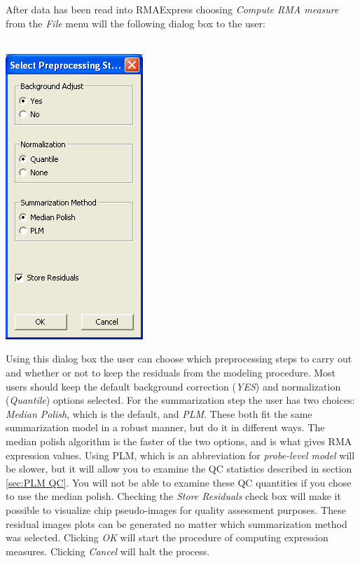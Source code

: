 \documentclass[11pt]{report}
\begin{document}
After data has been read into RMAExpress choosing {\it Compute RMA measure} from the {\it File} menu will the following dialog box to the user: \\ \\
\begin{center}
\includegraphics[scale=0.5]{preprocessingstep}
\end{center}
Using this dialog box the user can choose which preprocessing steps to carry out and whether or not to keep the residuals from the modeling procedure. Most users should keep the default background correction ({\it YES}) and normalization ({\it Quantile}) options selected. For the summarization step the user has two choices: {\it Median Polish}, which is the default, and {\it PLM}. These both fit the same summarization model in a robust manner, but do it in different ways. The median polish algorithm is the faster of the two options, and is what gives RMA expression values. Using PLM, which is an abbreviation for {\it probe-level model} will be slower, but it will allow you to examine the QC statistics described in section \ref{sec:PLM QC}. You will not be able to examine these QC quantities if you chose to use the median polish. Checking the {\it Store Residuals} check box will make it possible to visualize chip pseudo-images for quality assessment purposes. These residual images plots can be generated no matter which summarization method was selected. Clicking {\it OK} will start the procedure of computing expression measures. Clicking {\it Cancel} will halt the process.
\end{document}
